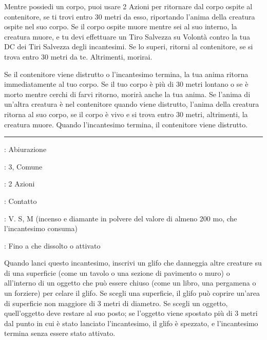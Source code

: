 \begin{multicols}{2}
Mentre possiedi un corpo, puoi usare 2 Azioni per ritornare dal corpo ospite al contenitore, se ti trovi entro 30 metri da esso, riportando l'anima della creatura ospite nel suo corpo. Se il corpo ospite muore mentre sei al suo interno, la creatura muore, e tu devi effettuare un Tiro Salvezza su Volontà contro la tua DC dei Tiri Salvezza degli incantesimi. Se lo superi, ritorni al contenitore, se si trova entro 30 metri da te. Altrimenti, morirai.

Se il contenitore viene distrutto o l'incantesimo termina, la tua anima ritorna immediatamente al tuo corpo. Se il tuo corpo è più di 30 metri lontano o se è morto mentre cerchi di farvi ritorno, morirà anche la tua anima. Se l'anima di un'altra creatura è nel contenitore quando viene distrutto, l'anima della creatura ritorna al suo corpo, se il corpo è vivo e si trova entro 30 metri, altrimenti, la creatura muore. Quando l'incantesimo termina, il contenitore viene distrutto.

\smallskip\noindent\rule{\linewidth}{2pt} \hypertarget{Glifo di Interdizione}{}\smallskip{}
\noindent
\begin{description}[noitemsep, topsep=0pt, parsep=0pt, partopsep=0pt, leftmargin=0cm, labelwidth=2.8cm]
	\item[\textbf{Lista di Magia}]: Abiurazione
	\item[\textbf{Livello}]: 3, Comune
	\item[\textbf{T. di Lancio}]: 2 Azioni
	\item[\textbf{Gittata}]: Contatto
	\item[\textbf{Componenti}]: V. S, M (incenso e diamante in polvere del valore di almeno 200 mo, che l'incantesimo consuma)
	\item[\textbf{Durata}]: Fino a che dissolto o attivato
\end{description}

Quando lanci questo incantesimo, inscrivi un glifo che danneggia altre creature su di una superficie (come un tavolo o una sezione di pavimento o muro) o all'interno di un oggetto che può essere chiuso (come un libro, una pergamena o un forziere) per celare il glifo. Se scegli una superficie, il glifo può coprire un'area di superficie non maggiore di 3 metri di diametro. Se scegli un oggetto, quell'oggetto deve restare al suo posto; se l'oggetto viene spostato più di 3 metri dal punto in cui è stato lanciato l'incantesimo, il glifo è spezzato, e l'incantesimo termina senza essere stato attivato.


\end{multicols}
